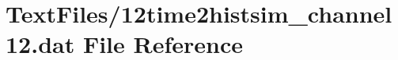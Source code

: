 \hypertarget{12time2histsim__channel12_8dat}{}\section{Text\+Files/12time2histsim\+\_\+channel12.dat File Reference}
\label{12time2histsim__channel12_8dat}
